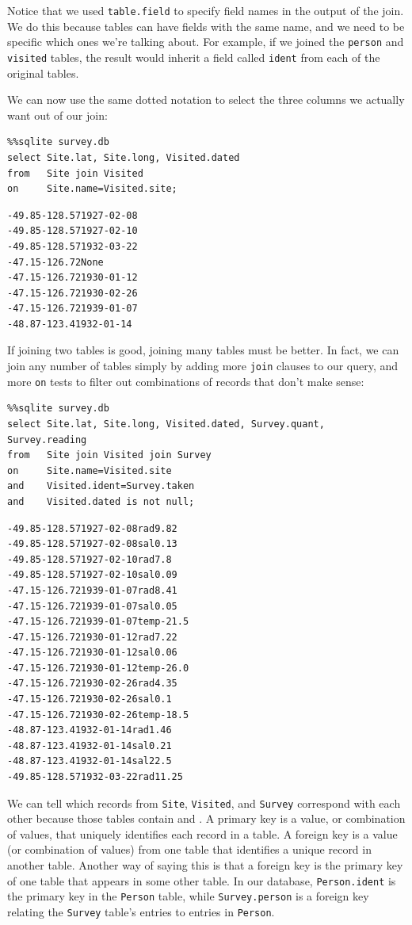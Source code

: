 \documentclass{book}
\begin{document}
Notice that we used \texttt{table.field} to specify field names in the
output of the join. We do this because tables can have fields with the
same name, and we need to be specific which ones we're talking about.
For example, if we joined the \texttt{person} and \texttt{visited}
tables, the result would inherit a field called \texttt{ident} from each
of the original tables.

We can now use the same dotted notation to select the three columns we
actually want out of our join:

\begin{verbatim}
%%sqlite survey.db
select Site.lat, Site.long, Visited.dated
from   Site join Visited
on     Site.name=Visited.site;
\end{verbatim}

\begin{verbatim}
-49.85-128.571927-02-08
-49.85-128.571927-02-10
-49.85-128.571932-03-22
-47.15-126.72None
-47.15-126.721930-01-12
-47.15-126.721930-02-26
-47.15-126.721939-01-07
-48.87-123.41932-01-14
\end{verbatim}

If joining two tables is good, joining many tables must be better. In
fact, we can join any number of tables simply by adding more
\texttt{join} clauses to our query, and more \texttt{on} tests to filter
out combinations of records that don't make sense:

\begin{verbatim}
%%sqlite survey.db
select Site.lat, Site.long, Visited.dated, Survey.quant, Survey.reading
from   Site join Visited join Survey
on     Site.name=Visited.site
and    Visited.ident=Survey.taken
and    Visited.dated is not null;
\end{verbatim}

\begin{verbatim}
-49.85-128.571927-02-08rad9.82
-49.85-128.571927-02-08sal0.13
-49.85-128.571927-02-10rad7.8
-49.85-128.571927-02-10sal0.09
-47.15-126.721939-01-07rad8.41
-47.15-126.721939-01-07sal0.05
-47.15-126.721939-01-07temp-21.5
-47.15-126.721930-01-12rad7.22
-47.15-126.721930-01-12sal0.06
-47.15-126.721930-01-12temp-26.0
-47.15-126.721930-02-26rad4.35
-47.15-126.721930-02-26sal0.1
-47.15-126.721930-02-26temp-18.5
-48.87-123.41932-01-14rad1.46
-48.87-123.41932-01-14sal0.21
-48.87-123.41932-01-14sal22.5
-49.85-128.571932-03-22rad11.25
\end{verbatim}

We can tell which records from \texttt{Site}, \texttt{Visited}, and
\texttt{Survey} correspond with each other because those tables contain
 and
. A primary key is a value, or
combination of values, that uniquely identifies each record in a table.
A foreign key is a value (or combination of values) from one table that
identifies a unique record in another table. Another way of saying this
is that a foreign key is the primary key of one table that appears in
some other table. In our database, \texttt{Person.ident} is the primary
key in the \texttt{Person} table, while \texttt{Survey.person} is a
foreign key relating the \texttt{Survey} table's entries to entries in
\texttt{Person}.
\end{document}

